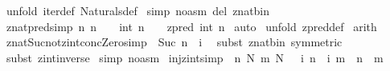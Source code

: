 \begin{isabellebody}
\ {\isacharparenleft}unfold\ iter{\isacharunderscore}def\ Naturals{\isacharunderscore}def{\isacharparenright}\isanewline
{}\isamarkupfalse%
\ {\isacharparenleft}simp\ {\isacharparenleft}no{\isacharunderscore}asm{\isacharparenright}\ del{\isacharcolon}\ znat{\isacharunderscore}bin{\isacharunderscore}{}{\isacharparenright}\isanewline
{}\isamarkupfalse%
%
\endisatagproof
{\isafoldproof}%
%
\isadelimproof
\isanewline
%
\endisadelimproof
\isanewline
{}\isamarkupfalse%
\ znat{\isacharunderscore}pred{\isacharbrackleft}simp{\isacharbrackright}{\isacharcolon}\ {\isachardoublequoteopen}{\isacharbang}{\isacharbang}n{\isachardot}\ n\ {\isachartilde}{\isacharequal}\ {}\ {\isacharequal}{\isacharequal}{\isachargreater}\ {\isacharparenleft}int\ {\isacharparenleft}n\ {\isacharminus}\ {}{\isacharparenright}{\isacharparenright}\ {\isacharequal}\ zpred\ {\isacharparenleft}int\ n{\isacharparenright}{\isachardoublequoteclose}\isanewline
%
\isadelimproof
%
\endisadelimproof
%
\isatagproof
{}\isamarkupfalse%
\ auto\isanewline
{}\isamarkupfalse%
\ {\isacharparenleft}unfold\ zpred{\isacharunderscore}def{\isacharparenright}\isanewline
{}\isamarkupfalse%
\ arith\isanewline
{}\isamarkupfalse%
%
\endisatagproof
{\isafoldproof}%
%
\isadelimproof
\isanewline
%
\endisadelimproof
\isanewline
{}\isamarkupfalse%
\ znat{\isacharunderscore}Suc{\isacharunderscore}not{\isacharunderscore}zint{\isacharunderscore}conc{\isacharunderscore}Zero{\isacharbrackleft}simp{\isacharbrackright}{\isacharcolon}\ {\isachardoublequoteopen}\ Suc\ n\ {\isachartilde}{\isacharequal}\ {\isachardollar}i\ {}{\isachardoublequoteclose}\isanewline
%
\isadelimproof
%
\endisadelimproof
%
\isatagproof
{}\isamarkupfalse%
\ {\isacharparenleft}subst\ znat{\isacharunderscore}bin{\isacharunderscore}{}\ {\isacharbrackleft}symmetric{\isacharbrackright}{\isacharparenright}\isanewline
{}\isamarkupfalse%
\ {\isacharparenleft}subst\ zint{\isacharunderscore}inverse{\isacharparenright}\isanewline
{}\isamarkupfalse%
\ {\isacharparenleft}simp\ {\isacharparenleft}no{\isacharunderscore}asm{\isacharparenright}{\isacharparenright}\isanewline
{}\isamarkupfalse%
%
\endisatagproof
{\isafoldproof}%
%
\isadelimproof
\isanewline
%
\endisadelimproof
\isanewline
{}\isamarkupfalse%
\ inj{\isacharunderscore}zint{\isacharbrackleft}simp{\isacharbrackright}{\isacharcolon}\ {\isachardoublequoteopen}{\isasymlbrakk}\ n{\isacharcolon}\ {\isacharpercent}N{\isacharsemicolon}\ m{\isacharcolon}\ {\isacharpercent}N\ {\isasymrbrakk}\ {\isasymLongrightarrow}\ {\isacharparenleft}{\isacharparenleft}{\isachardollar}i\ n{\isacharparenright}\ {\isacharequal}\ {\isacharparenleft}{\isachardollar}i\ m{\isacharparenright}{\isacharparenright}\ {\isacharequal}\ {\isacharparenleft}n\ {\isacharequal}\ m{\isacharparenright}{\isachardoublequoteclose}\isanewline

\end{isabellebody}
